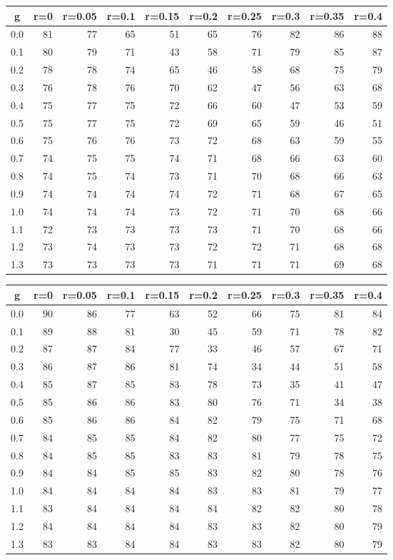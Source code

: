 %
\begin{table}[!tbp]
 \begin{center}
 \begin{tabular}{rrrrrrrrrr}\hline\hline
\multicolumn{1}{c}{g}&\multicolumn{1}{c}{r=0}&\multicolumn{1}{c}{r=0.05}&\multicolumn{1}{c}{r=0.1}&\multicolumn{1}{c}{r=0.15}&\multicolumn{1}{c}{r=0.2}&\multicolumn{1}{c}{r=0.25}&\multicolumn{1}{c}{r=0.3}&\multicolumn{1}{c}{r=0.35}&\multicolumn{1}{c}{r=0.4}\tabularnewline
\hline
0.0&81&77&65&51&65&76&82&86&88\tabularnewline
0.1&80&79&71&43&58&71&79&85&87\tabularnewline
0.2&78&78&74&65&46&58&68&75&79\tabularnewline
0.3&76&78&76&70&62&47&56&63&68\tabularnewline
0.4&75&77&75&72&66&60&47&53&59\tabularnewline
0.5&75&77&75&72&69&65&59&46&51\tabularnewline
0.6&75&76&76&73&72&68&63&59&55\tabularnewline
0.7&74&75&75&74&71&68&66&63&60\tabularnewline
0.8&74&75&74&73&71&70&68&66&63\tabularnewline
0.9&74&74&74&74&72&71&68&67&65\tabularnewline
1.0&74&74&74&73&72&71&70&68&66\tabularnewline
1.1&72&73&73&73&73&71&70&68&66\tabularnewline
1.2&73&74&73&73&72&72&71&68&68\tabularnewline
1.3&73&73&73&73&71&71&71&69&68\tabularnewline
\hline
\end{tabular}

\end{center}

\end{table}

%
\begin{table}[!tbp]
 \begin{center}
 \begin{tabular}{rrrrrrrrrr}\hline\hline
\multicolumn{1}{c}{g}&\multicolumn{1}{c}{r=0}&\multicolumn{1}{c}{r=0.05}&\multicolumn{1}{c}{r=0.1}&\multicolumn{1}{c}{r=0.15}&\multicolumn{1}{c}{r=0.2}&\multicolumn{1}{c}{r=0.25}&\multicolumn{1}{c}{r=0.3}&\multicolumn{1}{c}{r=0.35}&\multicolumn{1}{c}{r=0.4}\tabularnewline
\hline
0.0&90&86&77&63&52&66&75&81&84\tabularnewline
0.1&89&88&81&30&45&59&71&78&82\tabularnewline
0.2&87&87&84&77&33&46&57&67&71\tabularnewline
0.3&86&87&86&81&74&34&44&51&58\tabularnewline
0.4&85&87&85&83&78&73&35&41&47\tabularnewline
0.5&85&86&86&83&80&76&71&34&38\tabularnewline
0.6&85&86&86&84&82&79&75&71&68\tabularnewline
0.7&84&85&85&84&82&80&77&75&72\tabularnewline
0.8&84&85&85&83&83&81&79&78&75\tabularnewline
0.9&84&84&85&85&83&82&80&78&76\tabularnewline
1.0&84&84&84&84&83&83&81&79&77\tabularnewline
1.1&83&84&84&84&84&82&82&80&78\tabularnewline
1.2&84&84&84&84&83&83&82&80&79\tabularnewline
1.3&83&83&84&84&83&83&82&80&79\tabularnewline
\hline
\end{tabular}

\end{center}

\end{table}

